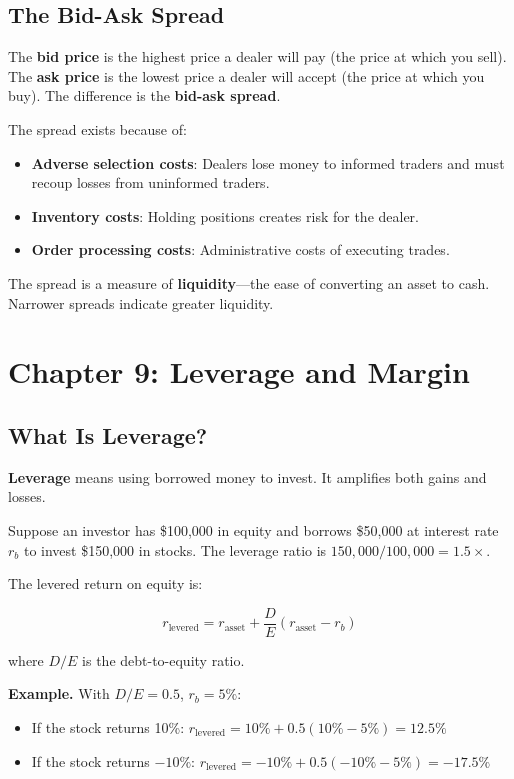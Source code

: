 \documentclass[11pt,letterpaper]{report}
\begin{document}
\section{The Bid-Ask Spread}


The \textbf{bid price} is the highest price a dealer will pay (the price at which you sell).  The \textbf{ask price} is the lowest price a dealer will accept (the price at which you buy).  The difference is the \textbf{bid-ask spread}.

The spread exists because of:

\begin{itemize}
  \item \textbf{Adverse selection costs}: Dealers lose money to informed traders and must recoup losses from uninformed traders.
  \item \textbf{Inventory costs}: Holding positions creates risk for the dealer.
  \item \textbf{Order processing costs}: Administrative costs of executing trades.
\end{itemize}

The spread is a measure of \textbf{liquidity}---the ease of converting an asset to cash.  Narrower spreads indicate greater liquidity.


\chapter{Chapter 9: Leverage and Margin}


\section{What Is Leverage?}


\textbf{Leverage} means using borrowed money to invest.  It amplifies both gains and losses.

Suppose an investor has \$100,000 in equity and borrows \$50,000 at interest rate $r_b$ to invest \$150,000 in stocks.  The leverage ratio is $150{,}000 / 100{,}000 = 1.5\times$.

The levered return on equity is:

$$r_{\text{levered}} = r_{\text{asset}} + \frac{D}{E}(r_{\text{asset}} - r_b)$$

where $D/E$ is the debt-to-equity ratio.

\textbf{Example.}  With $D/E = 0.5$, $r_b = 5\%$:

\begin{itemize}
  \item If the stock returns 10\%: $r_{\text{levered}} = 10\% + 0.5(10\% - 5\%) = 12.5\%$
  \item If the stock returns $-10\%$: $r_{\text{levered}} = -10\% + 0.5(-10\% - 5\%) = -17.5\%$
\end{itemize}
\end{document}
